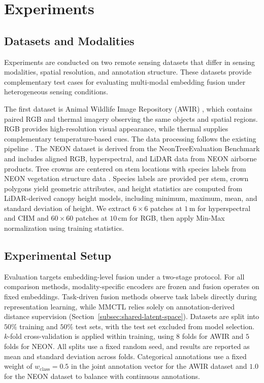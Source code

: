 \documentclass[lettersize,journal]{IEEEtran}
\begin{document}
\section{Experiments}

\subsection{Datasets and Modalities}
\label{subsec:datasets}

Experiments are conducted on two remote sensing datasets that differ in sensing modalities, spatial resolution, and annotation structure. These datasets provide complementary test cases for evaluating multi-modal embedding fusion under heterogeneous sensing conditions.

The first dataset is Animal Wildlife Image Repository (AWIR) \cite{samiappan2024aerial, zhou2025multi}, which contains paired RGB and thermal imagery observing the same objects and spatial regions. RGB provides high-resolution visual appearance, while thermal supplies complementary temperature-based cues. The data processing follows the existing pipeline \cite{zhou2025multi}. The NEON dataset is derived from the NeonTreeEvaluation Benchmark \cite{Weinstein_Marconi_White_2022} and includes aligned RGB, hyperspectral, and LiDAR data from NEON airborne products. Tree crowns are centered on stem locations with species labels from NEON vegetation structure data \cite{NEON_vegetation_structure}. Species labels are provided per stem, crown polygons yield geometric attributes, and height statistics are computed from LiDAR-derived canopy height models, including minimum, maximum, mean, and standard deviation of height. We extract $6\times6$ patches at $1\,\mathrm{m}$ for hyperspectral and CHM and $60\times60$ patches at $10\,\mathrm{cm}$ for RGB, then apply Min-Max normalization using training statistics.

\subsection{Experimental Setup}
Evaluation targets embedding-level fusion under a two-stage protocol. For all comparison methods, modality-specific encoders are frozen and fusion operates on fixed embeddings. Task-driven fusion methods observe task labels directly during representation learning, while MMCTL relies solely on annotation-derived distance supervision (Section~\ref{subsec:shared-latent-space}). Datasets are split into $50\%$ training and $50\%$ test sets, with the test set excluded from model selection. $k$-fold cross-validation is applied within training, using $8$ folds for AWIR and $5$ folds for NEON. All splits use a fixed random seed, and results are reported as mean and standard deviation across folds. Categorical annotations use a fixed weight of $w_{\text{class}} = 0.5$ in the joint annotation vector for the AWIR dataset and $1.0$ for the NEON dataset to balance with continuous annotations.
\end{document}
